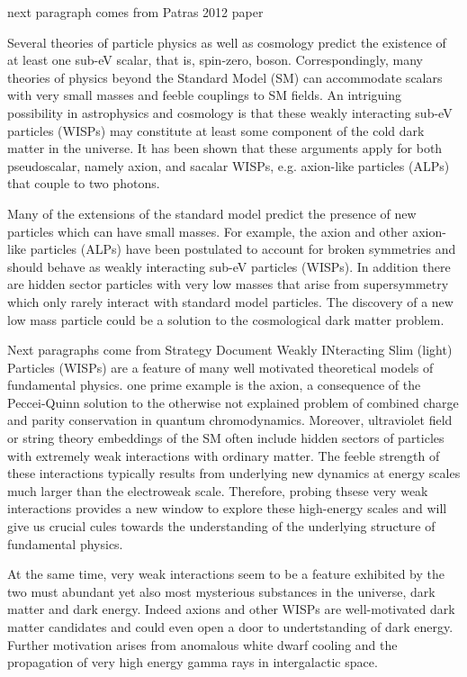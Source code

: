 \documentclass[12pt, twoside]{book}
\begin{document}
{\color{blue} next paragraph comes from Patras 2012 paper}

Several theories of particle physics as well as cosmology predict the existence of at least one sub-eV scalar, that is, spin-zero, boson. Correspondingly, many theories of physics beyond the Standard Model (SM) can accommodate scalars with very small masses and feeble couplings to SM fields. An  intriguing possibility in astrophysics and cosmology is that these weakly interacting sub-eV particles (WISPs) may constitute at least some component of the cold dark matter in the universe. It has been shown that these arguments apply for both pseudoscalar, namely axion, and sacalar WISPs, e.g. axion-like particles (ALPs) that couple to two photons.

Many of the extensions of the standard model predict the presence of new particles which can have small masses. For example, the axion and other axion-like particles (ALPs) have been postulated to account for broken symmetries and should behave as weakly interacting sub-eV particles (WISPs). In addition there are hidden sector particles with very low masses that arise from supersymmetry which only rarely interact with standard model particles. The discovery of a new low mass particle  could be a solution to the cosmological dark matter problem.

{\color{blue} Next paragraphs come from Strategy Document}
Weakly INteracting Slim (light) Particles (WISPs) are a feature of many well motivated theoretical models of fundamental physics. one prime example is the axion, a consequence of the Peccei-Quinn solution to the otherwise not explained problem of combined charge and parity conservation in quantum chromodynamics. Moreover, ultraviolet field or string theory embeddings of the SM often include hidden sectors of particles with extremely weak interactions with ordinary matter. The feeble strength of these interactions typically results from underlying new dynamics at energy scales much larger than the electroweak scale. Therefore, probing thsese very weak interactions provides a new window to explore these high-energy scales and will give us crucial cules towards the understanding of the underlying structure of fundamental physics.

At the same time, very weak interactions seem to be a feature exhibited by the two must abundant yet also most mysterious substances in the universe, dark matter and dark energy. Indeed axions and other WISPs are well-motivated dark matter candidates and could even open a door to undertstanding of dark energy. Further motivation arises from anomalous white dwarf cooling and the propagation of very high energy gamma rays in intergalactic space.
\end{document}
